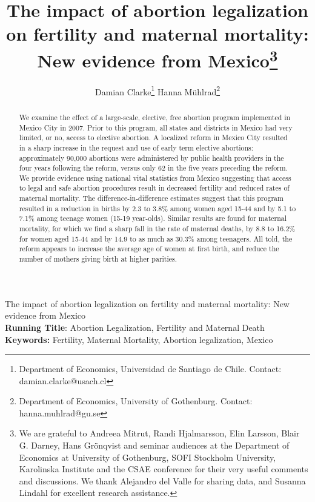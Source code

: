 \documentclass[a4paper, 11pt]{article}
\title{The impact of abortion legalization on fertility and maternal mortality: New evidence from Mexico\thanks{We are grateful to Andreea Mitrut, Randi Hjalmarsson, Elin Larsson, Blair G. Darney, Hans Gr\"onqvist and seminar audiences at the Department of Economics at University of Gothenburg,  SOFI Stockholm University, Karolinska Institute and the CSAE conference for their very useful comments and discussions.  We thank Alejandro del Valle for sharing data, and Susanna Lindahl for excellent research assistance.}}
\author{Damian Clarke\thanks{Department of Economics, Universidad de Santiago de Chile.  Contact: damian.clarke@usach.cl} \hspace{1cm} Hanna Mühlrad\thanks{Department of Economics, University of Gothenburg. Contact: hanna.muhlrad@gu.se}}
\begin{document}
\maketitle
\newpage
{}

\begin{spacing}{2}
\begin{center}
  {\Large The impact of abortion legalization on fertility and maternal mortality: New evidence from Mexico}
  \\
\vspace{5mm}
  \textbf{Running Title}: Abortion Legalization, Fertility and Maternal Death \\
\textbf{Keywords:} Fertility, Maternal Mortality, Abortion legalization, Mexico

\end{center}

\newpage

\begin{abstract}
\noindent We examine the effect of a large-scale, elective, free abortion program implemented in Mexico City in 2007. Prior to this program, all states and districts in Mexico had very limited, or no, access to elective abortion. A localized reform in Mexico City resulted in a sharp increase in the request and use of early term elective abortions: approximately 90,000 abortions were administered by public health providers in the four years following the reform, versus only 62 in the five years preceding the reform. We provide evidence using national vital statistics from Mexico suggesting that access to legal and safe abortion procedures result in decreased fertility and reduced rates of maternal mortality. The difference-in-difference estimates suggest that this program resulted in a reduction in births by 2.3 to 3.8\% among women aged 15-44 and by 5.1 to 7.1\% among teenage women (15-19 year-olds). Similar results are found for maternal mortality, for which we find a sharp fall in the rate of maternal deaths, by 8.8 to 16.2\% for women aged 15-44 and by 14.9 to as much as 30.3\% among teenagers.  All told, the reform appears to increase the average age of women at first birth, and reduce the number of mothers giving birth at higher parities.
\end{abstract}



\newpage 



\end{spacing}
\end{document}

